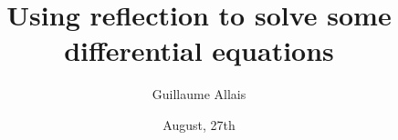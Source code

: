 \documentclass{beamer}
\author{Guillaume Allais}
\title{Using reflection to solve some differential equations}
\institute{Coqtail Junior Laboratory\\
	ENS Lyon}
\date{August, 27th}
\begin{document}
\begin{frame}[t,plain]
\titlepage
\end{frame}
\end{document}
